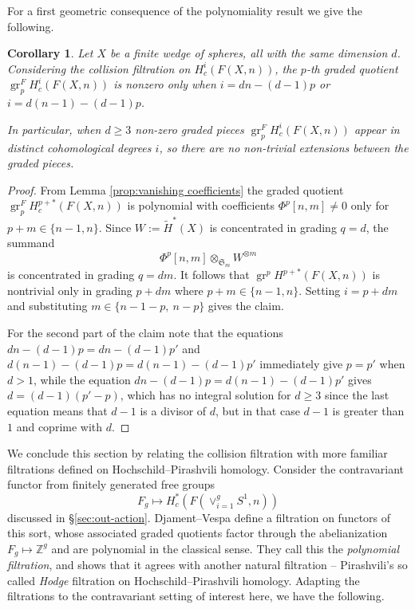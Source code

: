 \documentclass[12pt]{article}
\newcommand{\Z}{\mathbb{Z}}
\newcommand{\SymGroup}[1][n]{\mathfrak{S}_{#1}}
\DeclareMathOperator{\gr}{gr}
\theoremstyle{plain}
\newtheorem{cor}[thm]{Corollary}
\theoremstyle{definition}
\theoremstyle{remark}
\begin{document}
For a first geometric consequence of the polynomiality result we give the following.
\begin{cor}\label{cor:vanishing terms in E2}
    Let $X$ be a finite wedge of spheres, all with the same dimension $d$. Considering the collision filtration on $H^i_c(F(X,n))$, the $p$-th graded quotient $\gr^F_p H^{i}_c(F(X,n))$ is nonzero only when $i= dn- (d-1)p$ or $i=d(n-1) - (d-1)p$.

    In particular, when $d\geq 3$ non-zero graded pieces $\gr^F_p H^{i}_c(F(X, n))$ appear in distinct cohomological degrees $i$, so there are no non-trivial extensions between the graded pieces.
\end{cor}
\begin{proof}
From Lemma \ref{prop:vanishing coefficients} the graded quotient $\gr^F_p H_c^{p+*}(F(X,n))$ is polynomial with coefficients $\Phi^p[n,m]\neq 0$ only for $p+m\in \{n-1,n\}$. Since $W:= \tilde{H}^*(X)$ is concentrated in grading $q=d$, the summand
\[
\Phi^p[n,m]\otimes_{\SymGroup[m]} W^{\otimes m}
\]
is concentrated in grading $q=dm$. It follows that $\gr^p H^{p+*}(F(X,n))$ is nontrivial only in grading $p+dm$ where $p+m\in \{n-1,n\}$. Setting $i=p+dm$ and substituting $m \in \{ n-1 - p,\ n-p \}$ gives the claim.

For the second part of the claim note that the equations $dn - (d-1)p = dn - (d-1)p'$ and $d(n-1) - (d-1)p = d(n-1) - (d-1)p'$ immediately give $p = p'$ when $d > 1$, while the equation $dn - (d-1)p = d(n-1) - (d-1)p'$ gives $d = (d-1)(p' - p)$, which has no integral solution for $d\geq 3$ since the last equation means that $d-1$ is a divisor of $d$, but in that case $d-1$ is greater than $1$ and coprime with $d$.
\end{proof}

We conclude this section by relating the collision filtration with more familiar filtrations defined on Hochschild--Pirashvili homology. Consider the contravariant functor from finitely generated free groups
    \begin{equation}
        F_g \mapsto H^*_c\left( F(\vee_{i=1}^g S^1,n) \right)
    \end{equation}
    discussed in \S\ref{sec:out-action}. Djament--Vespa \cite{DV15} define a filtration on functors of this sort, whose associated graded quotients factor through the abelianization $F_g\mapsto \Z^g$ and are polynomial in the classical sense. They call this the \emph{polynomial filtration}, and \cite[Theorem 17.8]{PV18} shows that it agrees with another natural filtration -- Pirashvili's so called \emph{Hodge} filtration on Hochschild--Pirashvili homology. Adapting the filtrations to the contravariant setting of interest here, we have the following.
    
\end{document}
